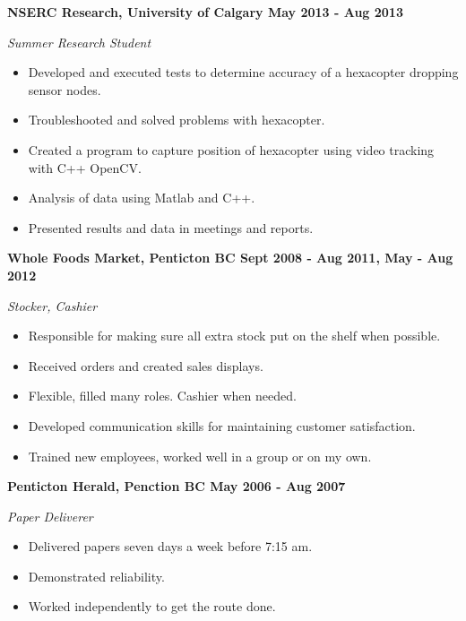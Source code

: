 \documentclass[12pt]{article} %
\begin{document}
\noindent \centerline{ \bf NSERC Research, University of Calgary \hfill May 2013 - Aug 2013}
\indent \emph{ Summer Research Student } 
\begin{itemize}
  \item Developed and executed tests to determine accuracy of a hexacopter dropping sensor nodes.
  \item Troubleshooted and solved problems with hexacopter.
  \item Created a program to capture position of hexacopter using video tracking with C++ OpenCV.
  \item Analysis of data using Matlab and C++.
  \item Presented results and data in meetings and reports.
\end{itemize}

\noindent \centerline{ \bf Whole Foods Market, Penticton BC \hfill Sept 2008 - Aug 2011, May - Aug 2012}
\indent \emph{Stocker, Cashier}
\begin{itemize}
  \item Responsible for making sure all extra stock put on the shelf when possible.
  \item Received orders and created sales displays.
  \item Flexible, filled many roles. Cashier when needed.
  \item Developed communication skills for maintaining customer satisfaction.
  \item Trained new employees, worked well in a group or on my own.
\end{itemize}

\noindent \centerline{ \bf Penticton Herald, Penction BC \hfill May 2006 - Aug 2007}
\indent \emph{ Paper Deliverer}
\begin{itemize}
  \item Delivered papers seven days a week before 7:15 am.
  \item Demonstrated reliability.
  \item Worked independently to get the route done.
\end{itemize}

\bigskip
{}
\bigskip
\end{document}
